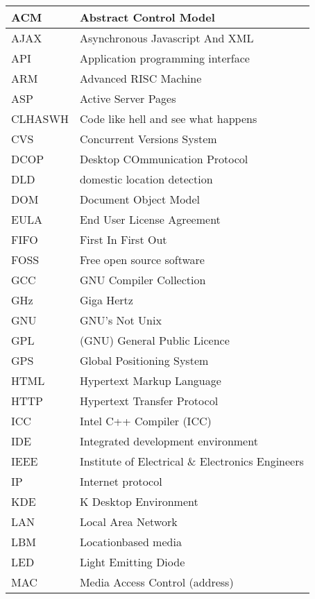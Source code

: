 \begin{center}
\begin{longtable}{|ll|}
   \hline
    ACM		& Abstract Control Model\\
   \hline
    AJAX	& Asynchronous Javascript And XML\\
   \hline
    API		& Application programming interface\\
   \hline
    ARM		& Advanced RISC Machine\\
   \hline
    ASP		& Active Server Pages\\
   \hline
    CLHASWH	& Code like hell and see what happens\\
   \hline
    CVS		& Concurrent Versions System\\
   \hline
    DCOP	& Desktop COmmunication Protocol\\
   \hline
    DLD		& domestic location detection\\
   \hline
    DOM		& Document Object Model\\
   \hline
    EULA	& End User License Agreement\\
   \hline
    FIFO	& First In First Out\\
   \hline
    FOSS	& Free open source software\\
   \hline
    GCC		& GNU Compiler Collection\\
   \hline
    GHz		& Giga Hertz\\
   \hline
    GNU		& GNU's Not Unix\\
   \hline
    GPL		& (GNU) General Public Licence\\
   \hline
    GPS		& Global Positioning System\\
   \hline
    HTML	& Hypertext Markup Language\\
   \hline
    HTTP	& Hypertext Transfer Protocol\\
   \hline
    ICC		& Intel C++ Compiler (ICC)\\
   \hline
    IDE		& Integrated development environment\\
   \hline
    IEEE	& Institute of Electrical \& Electronics Engineers\\
   \hline
    IP		& Internet protocol\\
   \hline
    KDE		& K Desktop Environment\\
   \hline
    LAN		& Local Area Network\\
   \hline
    LBM		& Location\-based media\\
   \hline
    LED		& Light Emitting Diode\\
   \hline
    MAC		& Media Access Control (address)\\

\end{longtable}
\end{center}
